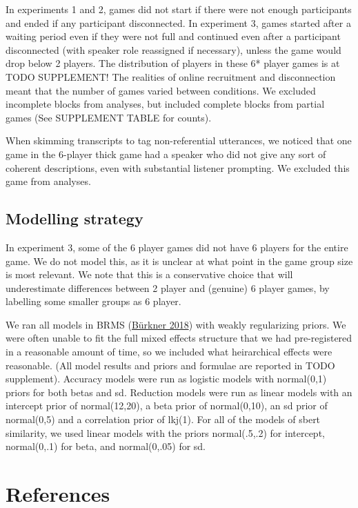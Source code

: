\documentclass[
  english,
  a4paper,
]{article}
\begin{document}
In experiments 1 and 2, games did not start if there were not enough participants and ended if any participant disconnected. In experiment 3, games started after a waiting period even if they were not full and continued even after a participant disconnected (with speaker role reassigned if necessary), unless the game would drop below 2 players. The distribution of players in these 6* player games is at TODO SUPPLEMENT! The realities of online recruitment and disconnection meant that the number of games varied between conditions. We excluded incomplete blocks from analyses, but included complete blocks from partial games (See SUPPLEMENT TABLE for counts).

When skimming transcripts to tag non-referential utterances, we noticed that one game in the 6-player thick game had a speaker who did not give any sort of coherent descriptions, even with substantial listener prompting. We excluded this game from analyses.

\hypertarget{modelling-strategy}{%
\subsection{Modelling strategy}\label{modelling-strategy}}

In experiment 3, some of the 6 player games did not have 6 players for the entire game. We do not model this, as it is unclear at what point in the game group size is most relevant. We note that this is a conservative choice that will underestimate differences between 2 player and (genuine) 6 player games, by labelling some smaller groups as 6 player.

We ran all models in BRMS (\protect\hyperlink{ref-burkner2018}{Bürkner 2018}) with weakly regularizing priors. We were often unable to fit the full mixed effects structure that we had pre-registered in a reasonable amount of time, so we included what heirarchical effects were reasonable. (All model results and priors and formulae are reported in TODO supplement). Accuracy models were run as logistic models with normal(0,1) priors for both betas and sd. Reduction models were run as linear models with an intercept prior of normal(12,20), a beta prior of normal(0,10), an sd prior of normal(0,5) and a correlation prior of lkj(1). For all of the models of sbert similarity, we used linear models with the priors normal(.5,.2) for intercept, normal(0,.1) for beta, and normal(0,.05) for sd.

\hypertarget{references}{%
\section{References}\label{references}}
\end{document}

